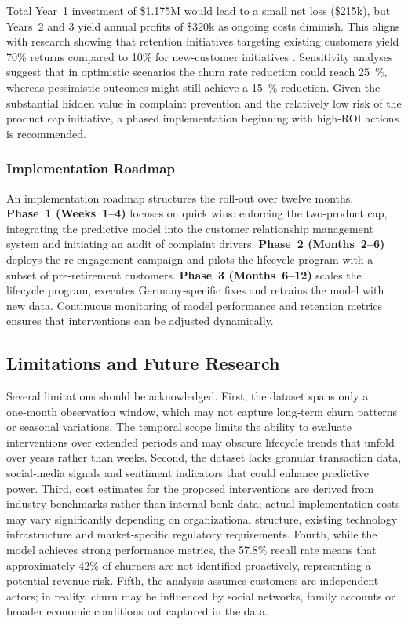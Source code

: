 \documentclass[12pt]{article}
\begin{document}
Total Year~1 investment of \$1.175M would lead to a small net loss (\$215k), but Years~2 and 3 yield annual profits of \$320k as ongoing costs diminish.  This aligns with research showing that retention initiatives targeting existing customers yield 70\% returns compared to 10\% for new‑customer initiatives \citep{browning2024retention}.  Sensitivity analyses suggest that in optimistic scenarios the churn rate reduction could reach 25~\%, whereas pessimistic outcomes might still achieve a 15~\% reduction.  Given the substantial hidden value in complaint prevention and the relatively low risk of the product cap initiative, a phased implementation beginning with high‑ROI actions is recommended.

\subsubsection{Implementation Roadmap}
An implementation roadmap structures the roll‑out over twelve months.  \textbf{Phase~1 (Weeks~1–4)} focuses on quick wins: enforcing the two‑product cap, integrating the predictive model into the customer relationship management system and initiating an audit of complaint drivers.  \textbf{Phase~2 (Months~2–6)} deploys the re‑engagement campaign and pilots the lifecycle program with a subset of pre‑retirement customers.  \textbf{Phase~3 (Months~6–12)} scales the lifecycle program, executes Germany‑specific fixes and retrains the model with new data.  Continuous monitoring of model performance and retention metrics ensures that interventions can be adjusted dynamically.

\subsection{Limitations and Future Research}
Several limitations should be acknowledged.  First, the dataset spans only a one‑month observation window, which may not capture long‑term churn patterns or seasonal variations.  The temporal scope limits the ability to evaluate interventions over extended periods and may obscure lifecycle trends that unfold over years rather than weeks.  Second, the dataset lacks granular transaction data, social‑media signals and sentiment indicators that could enhance predictive power.  Third, cost estimates for the proposed interventions are derived from industry benchmarks rather than internal bank data; actual implementation costs may vary significantly depending on organizational structure, existing technology infrastructure and market‑specific regulatory requirements.  Fourth, while the model achieves strong performance metrics, the 57.8\% recall rate means that approximately 42\% of churners are not identified proactively, representing a potential revenue risk.  Fifth, the analysis assumes customers are independent actors; in reality, churn may be influenced by social networks, family accounts or broader economic conditions not captured in the data.
\end{document}
